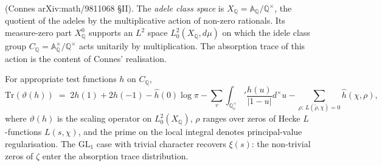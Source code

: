 \begin{definition}
\label{v4-arith:hpvbconv:def:adele-class-space}
(Connes arXiv:math/9811068 \S II). The
\emph{adele class space} is
\(X_{\mathbb{Q}}=\mathbb{A}_{\mathbb{Q}}/\mathbb{Q}^{\times}\), the
quotient of the adeles by the multiplicative action of non-zero
rationals. Its measure-zero part \(X_{\mathbb{Q}}^{0}\) supports an
\(L^{2}\) space \(L^{2}_{0}(X_{\mathbb{Q}},d\mu)\) on which the idele
class group \(C_{\mathbb{Q}}=\mathbb{A}_{\mathbb{Q}}^{\times}/\mathbb{Q}^{\times}\)
acts unitarily by multiplication. The absorption trace of this action
is the content of Connes' realisation.
\end{definition}

\begin{theorem}
\label{v4-arith:hpvbconv:thm:connes-trace-formula}
For appropriate test functions \(h\) on
\(C_{\mathbb{Q}}\),
\begin{equation}
\label{v4-arith:hpvbconv:eq:connes-trace-formula}
\mathrm{Tr}(\vartheta(h))\;=\;2h(1)+2h(-1)-\hat{h}(0)\log\pi-\sum_{v}\int_{\mathbb{Q}_{v}^{\times}}'\frac{h(u)}{|1-u|}d^{\times}u-\sum_{\rho:\,L(\tilde{\rho},\chi)=0}\hat{h}(\chi,\rho),
\end{equation}
where \(\vartheta(h)\) is the scaling operator on \(L^{2}_{0}(X_{\mathbb{Q}})\),
\(\rho\) ranges over zeros of Hecke \(L\)-functions \(L(s,\chi)\), and the
prime on the local integral denotes principal-value regularisation.
The \(\mathrm{GL}_{1}\) case with trivial character recovers
\(\xi(s)\): the non-trivial zeros of \(\zeta\) enter the absorption
trace distribution.
\end{theorem}

